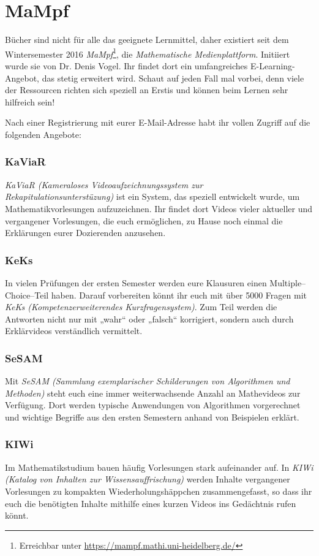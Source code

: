 \section{MaMpf}
\label{mampf}

Bücher sind nicht für alle das geeignete Lernmittel, daher existiert seit dem Wintersemester 2016 \emph{MaMpf}\footnote{Erreichbar unter \url{https://mampf.mathi.uni-heidelberg.de/}}, die \emph{Mathematische Medienplattform}. Initiiert wurde sie von Dr. Denis Vogel. Ihr findet dort ein umfangreiches E-Learning-Angebot, das stetig erweitert wird. Schaut auf jeden Fall mal vorbei, denn viele der Ressourcen richten sich speziell an Erstis und können beim Lernen sehr hilfreich sein!

Nach einer Registrierung mit eurer E-Mail-Adresse habt ihr vollen Zugriff auf die folgenden Angebote:

\subsubsection{KaViaR}
\emph{KaViaR (Kameraloses Videoaufzeichnungssystem zur Rekapitulationsunterstüzung)} ist ein System, das speziell entwickelt wurde, um Mathematikvorlesungen aufzuzeichnen. Ihr findet dort Videos vieler aktueller und vergangener Vorlesungen, die euch ermöglichen, zu Hause noch einmal die Erklärungen eurer Dozierenden anzusehen.

\subsubsection{KeKs}
In vielen Prüfungen der ersten Semester werden eure Klausuren einen Multiple--Choice--Teil haben. Darauf vorbereiten könnt ihr euch mit über 5000 Fragen mit \emph{KeKs (Kompetenzerweiterendes Kurzfragensystem)}. Zum Teil werden die Antworten nicht nur mit „wahr“ oder „falsch“ korrigiert, sondern auch durch Erklärvideos verständlich vermittelt.

\subsubsection{SeSAM}
Mit \emph{SeSAM (Sammlung exemplarischer Schilderungen von Algorithmen und Methoden)} steht euch eine immer weiterwachsende Anzahl an Mathevideos zur Verfügung. Dort werden typische Anwendungen von Algorithmen vorgerechnet und wichtige Begriffe aus den ersten Semestern anhand von Beispielen erklärt. 

\subsubsection{KIWi}
Im Mathematikstudium bauen häufig Vorlesungen stark aufeinander auf. In \emph{KIWi (Katalog von Inhalten zur Wissensauffrischung)} werden Inhalte vergangener Vorlesungen zu kompakten Wiederholungshäppchen zusammengefasst, so dass ihr euch die benötigten Inhalte mithilfe eines kurzen Videos ins Gedächtnis rufen könnt.

